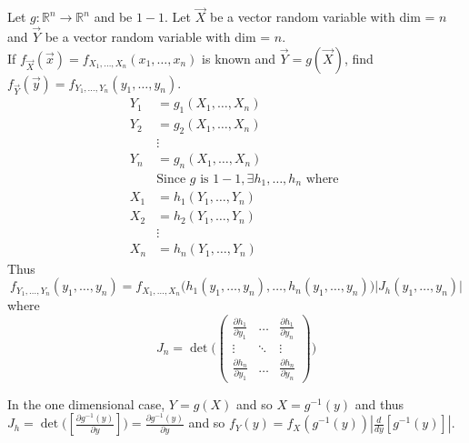 \documentclass[12pt]{article}
\newcommand{\ginvy}{g^{-1}(y)}
\begin{document}
Let $g: \mathbb{R}^n \to \mathbb{R}^n$ and be $1-1$. Let $\vec{X}$ be a vector random variable with dim = $n$ and $\vec{Y}$ be a vector random variable with dim = $n$. \\
If $f_{\vec{X}}(\vec{x}) = f_{X_1, \dots, X_n}(x_1, \dots, x_n)$ is known and $\vec{Y} = g(\vec{X})$, find $f_{\vec{Y}}(\vec{y}) = f_{Y_1, \dots, Y_n}(y_1, \dots, y_n)$. 
$$ \begin{aligned} Y_1 &= g_1(X_1, \dots, X_n) \\ Y_2 &= g_2(X_1, \dots, X_n) \\ &\vdots \\ Y_n &= g_n(X_1, \dots, X_n) \\ &\text{Since } g \text{ is } 1-1, \exists h_1, \dots, h_n \text{ where } \\ 
X_1 &= h_1(Y_1, \dots, Y_n) \\ X_2 &= h_2(Y_1, \dots, Y_n) \\ &\vdots \\ X_n &= h_n(Y_1, \dots, Y_n) \end{aligned} $$ 
Thus $$f_{Y_1, \dots, Y_n}(y_1, \dots, y_n) = f_{X_1, \dots, X_n}\Big(h_1(y_1, \dots, y_n), \dots, h_n(y_1, \dots, y_n)\Big)\Big| J_h(y_1, \dots, y_n)\Big| $$ 
where $$J_n = \det \Bigg( \begin{pmatrix} \frac{\partial h_1}{\partial y_1} & \dots & \frac{\partial h_1}{\partial y_n} \\ \vdots & \ddots & \vdots \\ \frac{\partial h_n}{\partial y_1} & \dots & \frac{\partial h_n}{\partial y_n} \end{pmatrix} \Bigg) $$ 

In the one dimensional case, $Y = g(X)$ and so $X = \ginvy$ and thus $J_h = \det \Big( [ \frac{\partial \ginvy}{\partial y} ] \Big) = \frac{\partial \ginvy}{\partial y}$ and so $f_Y(y) = f_X(\ginvy)|\frac{d}{dy} [\ginvy]|$. \\~\\
\end{document}

